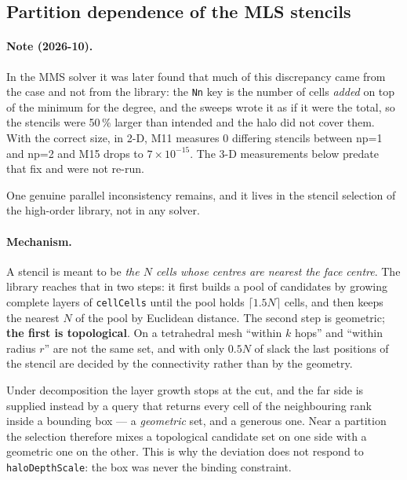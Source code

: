 \documentclass[11pt,a4paper]{article}
\newcommand{\code}[1]{\texttt{\small #1}}
\newcommand{\dictkey}[1]{\textcolor{black!60!green}{\texttt{\footnotesize #1}}}
\begin{document}
\subsection{Partition dependence of the MLS stencils}
\label{sec:dist-stencils}

\paragraph{Note (2026-10).} In the MMS solver it was later found that much of
this discrepancy came from the case and not from the library: the \code{Nn} key is
the number of cells \emph{added} on top of the minimum for the degree, and the
sweeps wrote it as if it were the total, so the stencils were 50\,\% larger than
intended and the halo did not cover them. With the correct size, in 2-D, M11
measures 0 differing stencils between np=1 and np=2 and M15 drops to
$7\times10^{-15}$. The 3-D measurements below predate that fix and were not re-run.

One genuine parallel inconsistency remains, and it lives in the stencil
selection of the high-order library, not in any solver.

\paragraph{Mechanism.} A stencil is meant to be \emph{the $N$ cells whose
centres are nearest the face centre}. The library reaches that in two steps: it
first builds a pool of candidates by growing complete layers of
\code{cellCells} until the pool holds $\lceil 1.5N \rceil$ cells, and then keeps
the nearest $N$ of the pool by Euclidean distance. The second step is geometric;
\textbf{the first is topological}. On a tetrahedral mesh ``within $k$ hops'' and
``within radius $r$'' are not the same set, and with only $0.5N$ of slack the
last positions of the stencil are decided by the connectivity rather than by the
geometry.

Under decomposition the layer growth stops at the cut, and the far side is
supplied instead by a query that returns every cell of the neighbouring rank
inside a bounding box --- a \emph{geometric} set, and a generous one. Near a
partition the selection therefore mixes a topological candidate set on one side
with a geometric one on the other. This is why the deviation does not respond to
\dictkey{haloDepthScale}: the box was never the binding constraint.
\end{document}
